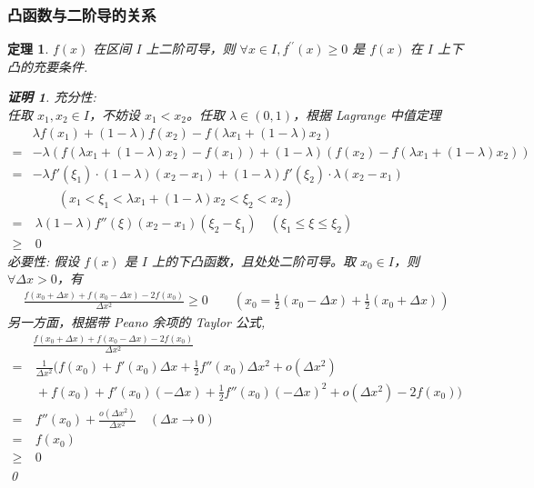 \documentclass{ctexart}
\newcommand{\。}{．} %
\newcommand{\dds}{^{\prime\prime}}
\newenvironment{huangse}{
    \begin{tcolorbox}[enhanced, colback=qhuang, boxrule=0pt, frame hidden,
        borderline west={0.7mm}{0.1mm}{shuang}]
    }
    {\end{tcolorbox}}
\theoremstyle{t} %
\newtheorem{dlhj}{\color{shuang} 定理}[subsection]
\newtheorem*{zmhj}{\color{slan} 证明}
\newenvironment{dl}{\begin{huangse}\begin{dlhj}}{\end{dlhj}\end{huangse}}
\begin{document}
\subsubsection{凸函数与二阶导的关系}

\begin{dl}
    $f(x)$ 在区间 $I$ 上二阶可导，则 $\forall x \in I, f\dds(x) \geqslant 0$ 是 $f(x)$ 在 $I$ 上下凸的充要条件. 
    \begin{zmhj}
        充分性: \\
        任取 $x_1, x_2 \in I$，不妨设 $x_1 < x_2$。任取 $\lambda \in (0,1)$，根据 Lagrange 中值定理
        \begin{align*}
            & \lambda f(x_1) + (1 - \lambda) f(x_2) - f(\lambda x_1 + (1 - \lambda)x_2) \\
            = & -\lambda \left( f(\lambda x_1 + (1 - \lambda)x_2) - f(x_1) \right) + (1 - \lambda) \left( f(x_2) - f(\lambda x_1 + (1 - \lambda)x_2) \right) \\
            = & -\lambda f'(\xi_1) \cdot (1 - \lambda)(x_2 - x_1) + (1 - \lambda)f'(\xi_2) \cdot \lambda(x_2 - x_1) \quad \\
            & \qquad (x_1 < \xi_1 < \lambda x_1 + (1 - \lambda)x_2 < \xi_2 < x_2) \\
            = & \ \lambda (1 - \lambda) f''(\xi) (x_2 - x_1)(\xi_2 - \xi_1) \quad (\xi_1 \leq \xi \leq \xi_2) \\
            \geqslant & \  0
        \end{align*}
        必要性: 假设 $f(x)$ 是 $I$ 上的下凸函数，且处处二阶可导。取 $x_0 \in I$，则 $\forall \Delta x > 0$，有
        \begin{align*}
            \frac{f(x_0 + \Delta x) + f(x_0 - \Delta x) - 2f(x_0)}{\Delta x^2} \geq 0 
            \qquad \left( x_0 = \frac{1}{2} (x_0 - \Delta x) + \frac{1}{2}(x_0 + \Delta x) \right)
        \end{align*}
        另一方面，根据带 Peano 余项的 Taylor 公式, 
        \begin{align*}
            & \frac{f(x_0 + \Delta x) + f(x_0 - \Delta x) - 2f(x_0)}{\Delta x^2} \\
            = & \ \frac{1}{\Delta x^2} \Bigg( f(x_0) + f'(x_0) \Delta x + \frac{1}{2} f''(x_0) \Delta x^2 + o(\Delta x^2)  \\
            & \  + f(x_0) + f'(x_0)(-\Delta x) + \frac{1}{2} f''(x_0)(-\Delta x)^2 + o(\Delta x^2) - 2f(x_0) \Bigg)\\
            = &\  f''(x_0) + \frac{o(\Delta x^2)}{\Delta x^2} \quad (\Delta x \to 0) \\
            = & \ f(x_0) \\
            \geqslant & \ 0
        \end{align*}
        \qed
    \end{zmhj}
\end{dl}
\end{document}
